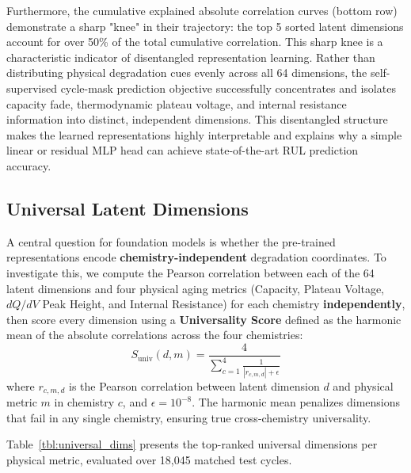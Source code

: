 \documentclass[a4paper,fleqn]{cas-dc}
\begin{document}
Furthermore, the cumulative explained absolute correlation curves (bottom row) demonstrate a sharp "knee" in their trajectory: the top 5 sorted latent dimensions account for over 50\% of the total cumulative correlation. This sharp knee is a characteristic indicator of disentangled representation learning. Rather than distributing physical degradation cues evenly across all 64 dimensions, the self-supervised cycle-mask prediction objective successfully concentrates and isolates capacity fade, thermodynamic plateau voltage, and internal resistance information into distinct, independent dimensions. This disentangled structure makes the learned representations highly interpretable and explains why a simple linear or residual MLP head can achieve state-of-the-art RUL prediction accuracy.

\subsection{Universal Latent Dimensions}
\label{sec:universal_dims}

A central question for foundation models is whether the pre-trained representations encode \textbf{chemistry-independent} degradation coordinates. To investigate this, we compute the Pearson correlation between each of the 64 latent dimensions and four physical aging metrics (Capacity, Plateau Voltage, $dQ/dV$ Peak Height, and Internal Resistance) for each chemistry \textbf{independently}, then score every dimension using a \textbf{Universality Score} defined as the harmonic mean of the absolute correlations across the four chemistries:
\begin{equation}
    S_{\text{univ}}(d, m) = \frac{4}{\sum_{c=1}^{4} \frac{1}{|r_{c,m,d}| + \epsilon}}
    \label{eq:universality}
\end{equation}
where $r_{c,m,d}$ is the Pearson correlation between latent dimension $d$ and physical metric $m$ in chemistry $c$, and $\epsilon = 10^{-8}$. The harmonic mean penalizes dimensions that fail in any single chemistry, ensuring true cross-chemistry universality.

Table~\ref{tbl:universal_dims} presents the top-ranked universal dimensions per physical metric, evaluated over 18,045 matched test cycles.
\end{document}
